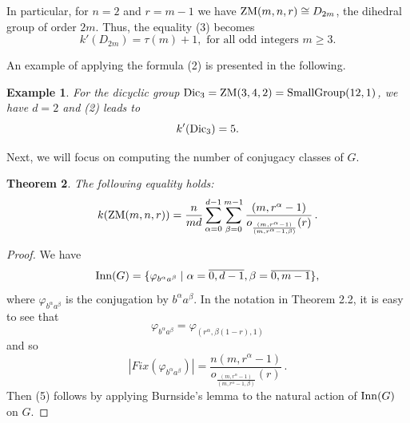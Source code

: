 \documentclass[12pt]{article}
\newtheorem{theorem}{Theorem}[section]
\newtheorem{example}[theorem]{Example}
\newcommand{\dd}{\displaystyle }
\newcommand{\0}{{\leqno}}
\begin{document}
In particular, for $n=2$ and $r=m-1$ we have ${\rm ZM}(m,n,r)\cong D_{2m}$, the dihedral group of order $2m$. Thus, the equality (3) becomes
\begin{equation}
k'(D_{2m})=\tau(m)+1, \mbox{ for all odd integers } m\geq 3.
\end{equation}

An example of applying the formula (2) is presented in the following.

\begin{example}
For the dicyclic group ${\rm Dic}_3={\rm ZM}(3,4,2)={\rm SmallGroup}(12,1)$, we have $d=2$ and (2) leads to
\begin{equation}
k'({\rm Dic}_3)=5.\nonumber
\end{equation}
\end{example}

Next, we will focus on computing the number of conjugacy classes of $G$.

\begin{theorem}
The following equality holds:
\begin{equation}
k({\rm ZM}(m,n,r))=\dd\frac{n}{md}\dd\sum_{\alpha=0}^{d-1}\dd\sum_{\beta=0}^{m-1}\frac{(m,r^{\alpha}-1)}{o_{\frac{(m,r^{\alpha}-1)}{(m,r^{\alpha}-1,\beta)}}(r)}\,.
\end{equation}
\end{theorem}

\begin{proof}
We have
\begin{equation}
{\rm Inn}(G)=\{\varphi_{b^{\alpha}a^{\beta}}\mid \alpha=\overline{0,d-1}, \beta=\overline{0,m-1}\},\nonumber
\end{equation}where $\varphi_{b^{\alpha}a^{\beta}}$ is the conjugation by $b^{\alpha}a^{\beta}$. In the notation in Theorem 2.2, it is easy to see that
\begin{equation}
\varphi_{b^{\alpha}a^{\beta}}=\varphi_{(r^{\alpha},\beta(1-r),1)}\nonumber
\end{equation}and so
\begin{equation}
|Fix(\varphi_{b^{\alpha}a^{\beta}})|=\frac{n(m,r^{\alpha}-1)}{o_{\frac{(m,r^{\alpha}-1)}{(m,r^{\alpha}-1,\beta)}}(r)}\,.\nonumber
\end{equation}Then (5) follows by applying Burnside's lemma to the natural action of ${\rm Inn}(G)$ on $G$.
\end{proof}
\end{document}
